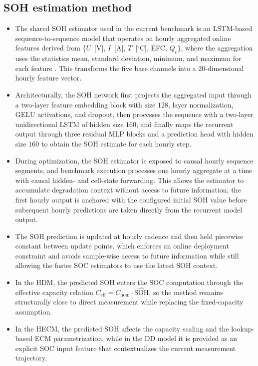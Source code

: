 \documentclass[review,nopreprintline]{elsarticle}
\begin{document}
\subsection{SOH estimation method}
\begin{itemize}[leftmargin=*]
    \item The shared SOH estimator used in the current benchmark is an LSTM-based sequence-to-sequence model that operates on hourly aggregated online features derived from \{$U$~[V], $I$~[A], $T$~[$^\circ$C], EFC, $Q_c$\}, where the aggregation uses the statistics mean, standard deviation, minimum, and maximum for each feature \cite{Embedded_AI_SOH_badData,gouEnsembleLearningBasedDataDriven2021,liOnlineCapacityEstimation2021,rzepkaNeuralNetworkArchitecture2023a}. This transforms the five base channels into a $20$-dimensional hourly feature vector.
    \item Architecturally, the SOH network first projects the aggregated input through a two-layer feature embedding block with size $128$, layer normalization, GELU activations, and dropout, then processes the sequence with a two-layer unidirectional LSTM of hidden size $160$, and finally maps the recurrent output through three residual MLP blocks and a prediction head with hidden size $160$ to obtain the SOH estimate for each hourly step.
    \item During optimization, the SOH estimator is exposed to causal hourly sequence segments, and benchmark execution processes one hourly aggregate at a time with causal hidden- and cell-state forwarding. This allows the estimator to accumulate degradation context without access to future information; the first hourly output is anchored with the configured initial SOH value before subsequent hourly predictions are taken directly from the recurrent model output.
    \item The SOH prediction is updated at hourly cadence and then held piecewise constant between update points, which enforces an online deployment constraint and avoids sample-wise access to future information while still allowing the faster SOC estimators to use the latest SOH context.
    \item In the HDM, the predicted SOH enters the SOC computation through the effective capacity relation $C_{\mathrm{eff}} = C_{\mathrm{nom}} \cdot \widehat{\mathrm{SOH}}$, so the method remains structurally close to direct measurement while replacing the fixed-capacity assumption.
    \item In the HECM, the predicted SOH affects the capacity scaling and the lookup-based ECM parametrization, while in the DD model it is provided as an explicit SOC input feature that contextualizes the current measurement trajectory.
\end{itemize}
\end{document}
